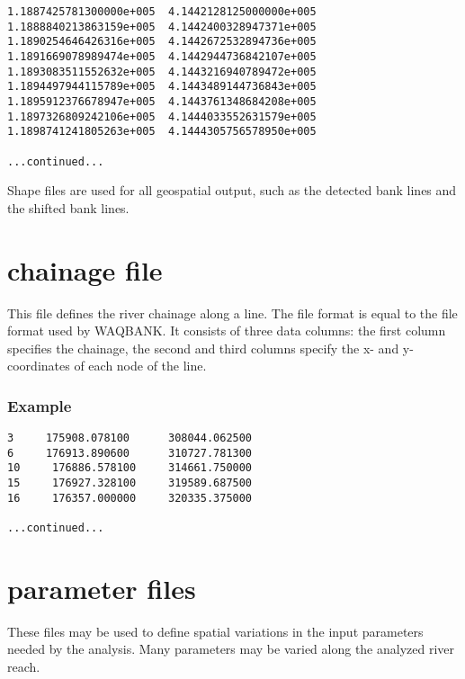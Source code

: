 \begin{Verbatim}
1.1887425781300000e+005  4.1442128125000000e+005
1.1888840213863159e+005  4.1442400328947371e+005
1.1890254646426316e+005  4.1442672532894736e+005
1.1891669078989474e+005  4.1442944736842107e+005
1.1893083511552632e+005  4.1443216940789472e+005
1.1894497944115789e+005  4.1443489144736843e+005
1.1895912376678947e+005  4.1443761348684208e+005
1.1897326809242106e+005  4.1444033552631579e+005
1.1898741241805263e+005  4.1444305756578950e+005

...continued...
\end{Verbatim}

Shape files are used for all geospatial output, such as the detected bank lines and the shifted bank lines.

\section{chainage file}

This file defines the river chainage along a line.
The file format is equal to the file format used by WAQBANK.
It consists of three data columns: the first column specifies the chainage, the second and third columns specify the x- and y-coordinates of each node of the line.

\subsubsection*{Example}

\begin{Verbatim}
3     175908.078100      308044.062500
6     176913.890600      310727.781300
10     176886.578100     314661.750000
15     176927.328100     319589.687500
16     176357.000000     320335.375000 

...continued...
\end{Verbatim}

\section{parameter files} \label{Sec:parfile}

These files may be used to define spatial variations in the input parameters needed by the analysis.
Many parameters may be varied along the analyzed river reach.

